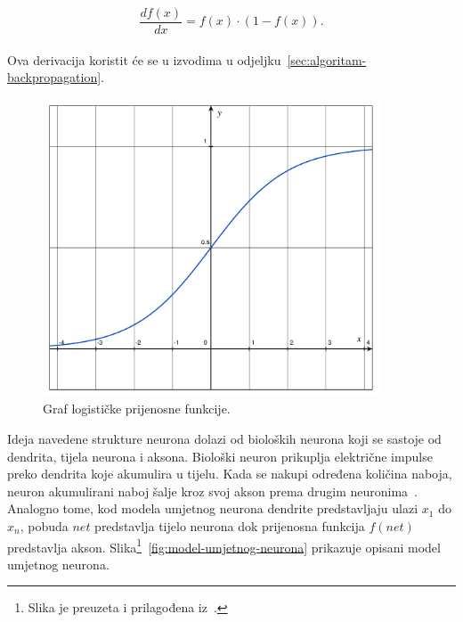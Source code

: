 \begin{equation}
    \frac{df(x)}{dx} = f(x) \cdot (1 - f(x)). \label{eq:logistic-derivation}
\end{equation}\\
Ova derivacija koristit će se u izvodima u odjeljku\ \ref{sec:algoritam-backpropagation}.
\begin{figure}[htb]
    \centering
    \includegraphics[width=10cm]{images/chapter3/logistic-function.pdf}
    \caption{Graf logističke prijenosne funkcije.}
    \label{fig:logistic-function}
\end{figure}
Ideja navedene strukture neurona dolazi od bioloških neurona koji se sastoje od dendrita, tijela neurona i
aksona. Biološki neuron prikuplja električne impulse preko dendrita koje akumulira u tijelu. Kada se nakupi određena
količina naboja, neuron akumulirani naboj šalje kroz svoj akson prema drugim neuronima\ \citep{cupic2013}. Analogno
tome, kod modela umjetnog neurona dendrite predstavljaju ulazi $x_1$ do $x_n$, pobuda $net$ predstavlja tijelo neurona
dok prijenosna funkcija $f(net)$ predstavlja akson. Slika\footnote{Slika je preuzeta i prilagođena
iz\ \citep{cupic2013}.}\ \ref{fig:model-umjetnog-neurona} prikazuje opisani model umjetnog neurona.

